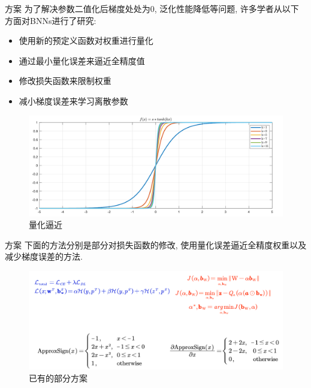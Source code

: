 \documentclass{beamer}
\begin{document}
\begin{frame}{方案}
	\footnotesize
    为了解决参数二值化后梯度处处为$0$, 泛化性能降低等问题, 许多学者从以下方面对BNNs进行了研究\cite{qin2020binary}:
    \begin{itemize}
        \item 使用新的预定义函数对权重进行量化
        \item 通过最小量化误差来逼近全精度值
        \item 修改损失函数来限制权重
        \item 减小梯度误差来学习离散参数
    \end{itemize}
    \begin{figure}[H]
        \centering
        \includegraphics[scale=0.2]{pic/appro.pdf}
        \caption{量化逼近}
    \end{figure}
\end{frame}

\begin{frame}{方案}
	\footnotesize
    下面的方法分别是部分对损失函数的修改, 使用量化误差逼近全精度权重以及减少梯度误差的方法.
    \begin{figure}[H]
        \centering
        \includegraphics[scale=0.3]{pic/m3.pdf}
        \caption{已有的部分方案}
    \end{figure}
\end{frame}
\end{document}
